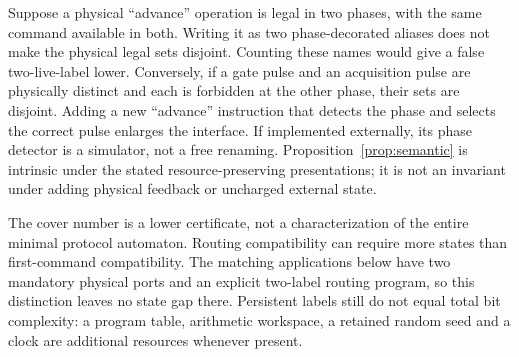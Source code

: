 \begin{example}\label{ex:alias}
Suppose a physical ``advance'' operation is legal in two phases, with the same command available in both. Writing it as two phase-decorated aliases does not make the physical legal sets disjoint. Counting these names would give a false two-live-label lower. Conversely, if a gate pulse and an acquisition pulse are physically distinct and each is forbidden at the other phase, their sets are disjoint. Adding a new ``advance'' instruction that detects the phase and selects the correct pulse enlarges the interface. If implemented externally, its phase detector is a simulator, not a free renaming. Proposition~\ref{prop:semantic} is intrinsic under the stated resource-preserving presentations; it is not an invariant under adding physical feedback or uncharged external state.
\end{example}

The cover number is a lower certificate, not a characterization of the entire minimal protocol automaton. Routing compatibility can require more states than first-command compatibility. The matching applications below have two mandatory physical ports and an explicit two-label routing program, so this distinction leaves no state gap there. Persistent labels still do not equal total bit complexity: a program table, arithmetic workspace, a retained random seed and a clock are additional resources whenever present.
